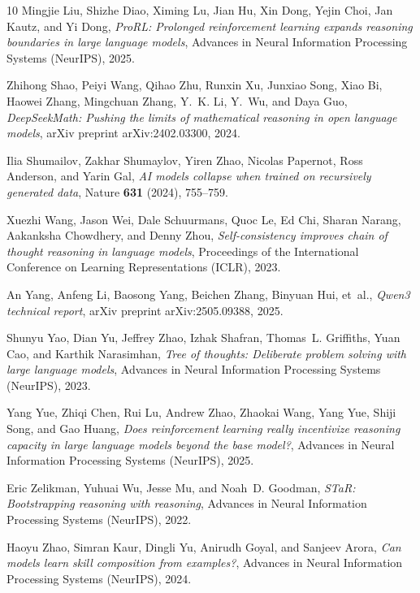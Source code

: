 \begin{thebibliography}{10}
Mingjie Liu, Shizhe Diao, Ximing Lu, Jian Hu, Xin Dong, Yejin Choi,
  Jan Kautz, and Yi Dong, \emph{{ProRL}: Prolonged reinforcement learning
  expands reasoning boundaries in large language models}, Advances in Neural
  Information Processing Systems (NeurIPS), 2025.

Zhihong Shao, Peiyi Wang, Qihao Zhu, Runxin Xu, Junxiao Song, Xiao Bi,
  Haowei Zhang, Mingchuan Zhang, Y.~K. Li, Y.~Wu, and Daya Guo,
  \emph{{DeepSeekMath}: Pushing the limits of mathematical reasoning in open
  language models}, arXiv preprint arXiv:2402.03300, 2024.

Ilia Shumailov, Zakhar Shumaylov, Yiren Zhao, Nicolas Papernot,
  Ross Anderson, and Yarin Gal, \emph{{AI} models collapse when trained on
  recursively generated data}, Nature \textbf{631} (2024), 755--759.

Xuezhi Wang, Jason Wei, Dale Schuurmans, Quoc Le, Ed Chi, Sharan Narang,
  Aakanksha Chowdhery, and Denny Zhou, \emph{Self-consistency improves chain of
  thought reasoning in language models}, Proceedings of the International
  Conference on Learning Representations (ICLR), 2023.

An Yang, Anfeng Li, Baosong Yang, Beichen Zhang, Binyuan Hui, et~al.,
  \emph{{Qwen3} technical report}, arXiv preprint arXiv:2505.09388, 2025.

Shunyu Yao, Dian Yu, Jeffrey Zhao, Izhak Shafran, Thomas~L. Griffiths,
  Yuan Cao, and Karthik Narasimhan, \emph{Tree of thoughts: Deliberate problem
  solving with large language models}, Advances in Neural Information
  Processing Systems (NeurIPS), 2023.

Yang Yue, Zhiqi Chen, Rui Lu, Andrew Zhao, Zhaokai Wang, Yang Yue,
  Shiji Song, and Gao Huang, \emph{Does reinforcement learning really
  incentivize reasoning capacity in large language models beyond the base
  model?}, Advances in Neural Information Processing Systems (NeurIPS), 2025.

Eric Zelikman, Yuhuai Wu, Jesse Mu, and Noah~D. Goodman, \emph{{STaR}:
  Bootstrapping reasoning with reasoning}, Advances in Neural Information
  Processing Systems (NeurIPS), 2022.

Haoyu Zhao, Simran Kaur, Dingli Yu, Anirudh Goyal, and Sanjeev Arora,
  \emph{Can models learn skill composition from examples?}, Advances in Neural
  Information Processing Systems (NeurIPS), 2024.

\end{thebibliography}

